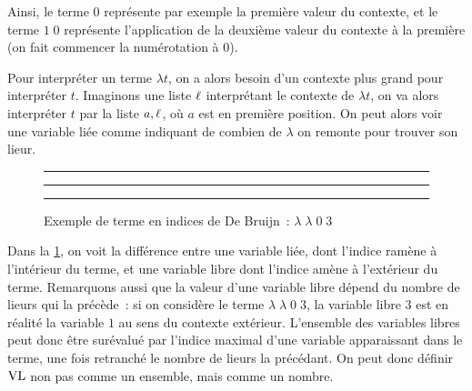 Ainsi, le terme $0$ représente par exemple la première valeur du contexte, et
le terme $1\;0$ représente l'application de la deuxième valeur du contexte à la
première (on fait commencer la numérotation à $0$).

Pour interpréter un terme $\lambda t$, on a alors besoin d'un contexte plus
grand pour interpréter $t$. Imaginons une liste $\ell$ interprétant le
contexte de $\lambda t$, on va alors interpréter $t$ par la liste $a,\ell$,
où $a$ est en première position. On peut alors voir une variable liée comme
indiquant de combien de $\lambda$ on remonte pour trouver son lieur.

\begin{figure}[ht!]
  \centering
  \hrule

  \vspace{0.2cm}

  \vspace{0.2cm}
  \hrule

  \vspace{0.4cm}
  \caption{Exemple de terme en indices de De Bruijn~: $\lambda\;\lambda\;0\;3$}
  \label{fig.deBruijn.ex}
  \hrule
\end{figure}

Dans la \cref{fig.deBruijn.ex}, on voit la différence entre une variable liée,
dont l'indice ramène à l'intérieur du terme, et une variable libre dont l'indice
amène à l'extérieur du terme. Remarquons aussi que la valeur d'une variable
libre dépend du nombre de lieurs qui la précède~: si on considère le terme
$\lambda\;\lambda\;0\;3$, la variable libre $3$ est en réalité la variable
$1$ au sens du contexte extérieur. L'ensemble des variables libres peut donc
être surévalué par l'indice maximal d'une variable apparaissant dans le terme,
une fois retranché le nombre de lieurs la précédant. On peut donc définir
$\operatorname{VL}$ non pas comme un ensemble, mais comme un nombre.

